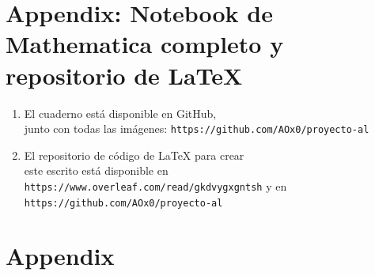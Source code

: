 \documentclass[a4paper]{article}
\begin{document}
\newpage
\section{Appendix: Notebook de Mathematica completo y repositorio de LaTeX}

\begin{enumerate}
\item El cuaderno está disponible en GitHub,\\ junto con todas las imágenes:
\texttt{https://github.com/AOx0/proyecto-al}
\item El repositorio de código de LaTeX para crear\\ este escrito está
disponible en\\  \texttt{https://www.overleaf.com/read/gkdvygxgntsh} y en
\texttt{https://github.com/AOx0/proyecto-al}
\end{enumerate}

\newpage
\section{Appendix}
\end{document}
